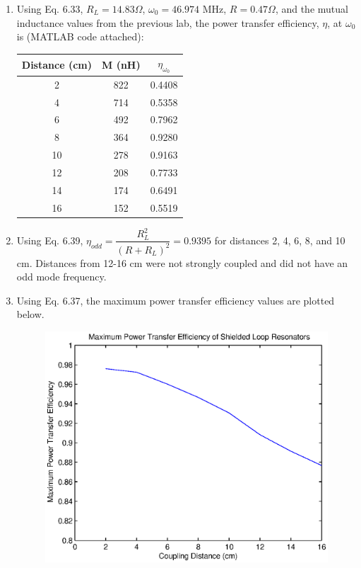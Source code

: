 \documentclass{article}
\begin{document}
\begin{enumerate}
	\item Using Eq. 6.33, $R_L = 14.83\Omega$, $\omega_0 = 46.974$ MHz, $R = 0.47\Omega$, and the mutual inductance values from the previous lab, the power transfer efficiency, $\eta$, at $\omega_0$ is (MATLAB code attached):
	\begin{table}[H]
	\centering
		\begin{tabular}{|c|c|c|}
		\hline
		Distance (cm) & M (nH)& $\eta_{\omega_0}$  \\ \hline
		2             & 822   & 0.4408  \\ \hline
		4             & 714   & 0.5358  \\ \hline
		6             & 492   & 0.7962  \\ \hline
		8             & 364   & 0.9280  \\ \hline
		10            & 278   & 0.9163  \\ \hline
		12            & 208   & 0.7733  \\ \hline
		14            & 174   & 0.6491  \\ \hline
		16            & 152   & 0.5519  \\ \hline
		\end{tabular}
	\end{table}

	\item Using Eq. 6.39, $\eta_{odd} = \dfrac{R_L^2}{(R+R_L)^2} = 0.9395$ for distances 2, 4, 6, 8, and 10 cm. Distances from 12-16 cm were not strongly coupled and did not have an odd mode frequency.
	\item Using Eq. 6.37, the maximum power transfer efficiency values are plotted below.
	\begin{figure}[H]
		\centering
   		\includegraphics[scale = 0.85]{./Matlab/Analysis2_1.eps}
	\end{figure}
\end{enumerate}
\end{document}
